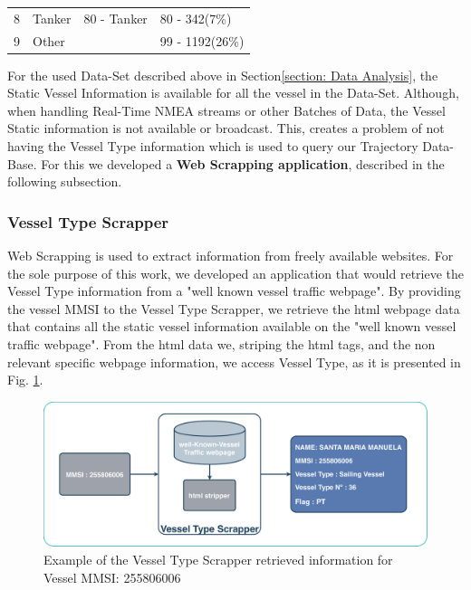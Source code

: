 \begin{table}[H]
\begin{tabular}{@{}clll@{}}
8           & Tanker                                                  & 80 - Tanker                                                & 80 - 342(7\%)                                                                           \\
9           & Other                                                   &                                                            & 99 - 1192(26\%)                                                                         \\ \bottomrule
\end{tabular}
\end{table}

For the used Data-Set described above in Section\ref{section: Data Analysis}, the Static Vessel Information is available for all the vessel in the Data-Set. Although, when handling Real-Time NMEA streams or other Batches of Data, the Vessel Static information is not available or broadcast. This, creates a problem of not having the Vessel Type information which is used to query our Trajectory Data-Base.
For this we developed a \textbf{Web Scrapping application}, described in the following subsection.

\subsubsection{Vessel Type Scrapper}
Web Scrapping is used to extract information from freely available websites. For the sole purpose of this work, we developed an application that would retrieve the Vessel Type information from a "well known vessel traffic webpage".
By providing the vessel MMSI to the Vessel Type Scrapper, we retrieve the html webpage data that contains all the static vessel information available on the "well known vessel traffic webpage". From the html data we, striping the html tags, and the non relevant specific webpage information, we access Vessel Type, as it is presented in Fig. \ref{fig:Scraper}.

\begin{figure}[H]
\centering
\includegraphics[scale = .4]{figures/Ch4/scrapper}
\caption{Example of the Vessel Type Scrapper retrieved information for Vessel MMSI: 255806006}
\label{fig:Scraper}
\end{figure}


